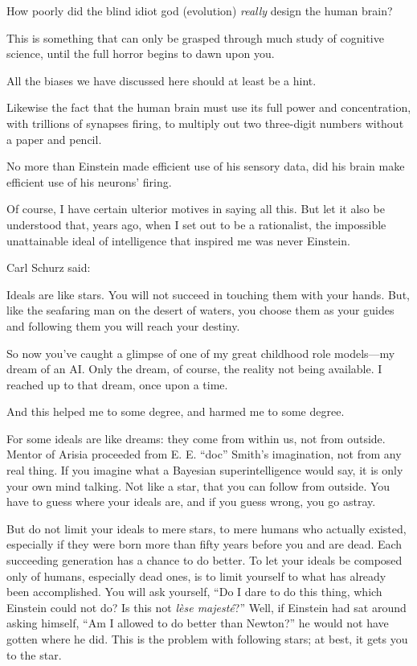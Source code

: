 {
 How poorly did the blind idiot god (evolution) \textit{really}
design the human brain?}

{
 This is something that can only be grasped through much study of
cognitive science, until the full horror begins to dawn upon you.}

{
 All the biases we have discussed here should at least be a hint.}

{
 Likewise the fact that the human brain must use its full power and
concentration, with trillions of synapses firing, to multiply out two
three-digit numbers without a paper and pencil.}

{
 No more than Einstein made efficient use of his sensory data, did
his brain make efficient use of his neurons' firing.}

{
 Of course, I have certain ulterior motives in saying all this. But
let it also be understood that, years ago, when I set out to be a
rationalist, the impossible unattainable ideal of intelligence that
inspired me was never Einstein.}

{
 Carl Schurz said:}

{
 Ideals are like stars. You will not succeed in touching them with
your hands. But, like the seafaring man on the desert of waters, you
choose them as your guides and following them you will reach your
destiny.}

{
 So now you've caught a glimpse of one of my great
childhood role models---my dream of an AI. Only the dream, of course,
the reality not being available. I reached up to that dream, once upon
a time.}

{
 And this helped me to some degree, and harmed me to some degree.}

{
 For some ideals are like dreams: they come from within us, not
from outside. Mentor of Arisia proceeded from E. E.
``doc'' Smith's
imagination, not from any real thing. If you imagine what a Bayesian
superintelligence would say, it is only your own mind talking. Not like
a star, that you can follow from outside. You have to guess where your
ideals are, and if you guess wrong, you go astray.}

{
 But do not limit your ideals to mere stars, to mere humans who
actually existed, especially if they were born more than fifty years
before you and are dead. Each succeeding generation has a chance to do
better. To let your ideals be composed only of humans, especially dead
ones, is to limit yourself to what has already been accomplished. You
will ask yourself, ``Do I dare to do this thing, which
Einstein could not do? Is this not \textit{lèse
majesté}?'' Well, if Einstein had sat around asking
himself, ``Am I allowed to do better than
Newton?'' he would not have gotten where he did. This
is the problem with following stars; at best, it gets you to the star.}

